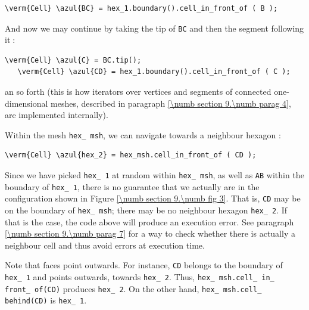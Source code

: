 \begin{Verbatim}[commandchars=\\\{\},formatcom=\small\tt,
   baselinestretch=0.94,framesep=2mm                      ]
   \verm{Cell} \azul{BC} = hex_1.boundary().cell_in_front_of ( B );
\end{Verbatim}

And now we may continue by taking the tip of {\small\tt BC} and then the segment
following it$\;$:

\begin{Verbatim}[commandchars=\\\{\},formatcom=\small\tt,
   baselinestretch=0.94,framesep=2mm                      ]
   \verm{Cell} \azul{C} = BC.tip();
   \verm{Cell} \azul{CD} = hex_1.boundary().cell_in_front_of ( C );
\end{Verbatim}

\noindent an so forth (this is how iterators over vertices and segments of connected
one-dimensional meshes, described in paragraph \ref{\numb section 9.\numb parag 4},
are implemented internally).

Within the mesh {\small\tt hex\_\,msh}, we can navigate towards a neighbour hexagon :

\begin{Verbatim}[commandchars=\\\{\},formatcom=\small\tt,
   baselinestretch=0.94,framesep=2mm                      ]
   \verm{Cell} \azul{hex_2} = hex_msh.cell_in_front_of ( CD );
\end{Verbatim}

Since we have picked {\small\tt hex\_\,1} at random within {\small\tt hex\_\,msh},
as well as {\small\tt AB} within the boundary of {\small\tt hex\_\,1},
there is no guarantee that we actually are in the configuration shown in
Figure \ref{\numb section 9.\numb fig 3}.
That is, {\small\tt CD} may be on the boundary of {\small\tt hex\_\,msh};
there may be no neighbour hexagon {\small\tt hex\_\,2}.
If that is the case, the code above will produce an execution error.
See paragraph \ref{\numb section 9.\numb parag 7} for a way to check whether there is actually
a neighbour cell and thus avoid errors at execution time.

Note that faces point outwards.
For instance, {\small\tt CD} belongs to the boundary of {\small\tt hex\_\,1} and points
outwards, towards {\small\tt hex\_\,2}.
Thus, {\small\tt hex\_\,msh.cell\_\,in\_\,front\_\,of(CD)} produces {\small\tt hex\_\,2}.
On the other hand, {\small\tt hex\_\,msh.cell\_\,behind(CD)} is {\small\tt hex\_\,1}.

